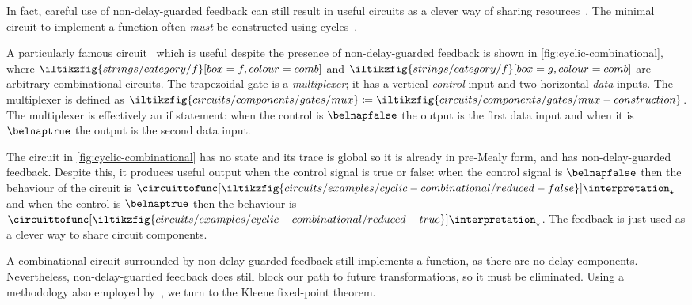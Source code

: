 In fact, careful use of non-delay-guarded feedback can still result in useful
circuits as a clever way of sharing
resources~\cite{malik1994analysis,riedel2004cyclic,mendler2012constructive}.
The minimal circuit to implement a function often \emph{must} be
constructed using cycles~\cite{rivest1977necessity,riedel2003synthesis}.



\begin{example}\label{ex:cyclic-combinational}
    A particularly famous circuit~\cite{malik1994analysis} which is useful
    despite the presence of non-delay-guarded feedback is shown in
    \cref{fig:cyclic-combinational}, where \(
    \iltikzfig{strings/category/f}[box=f,colour=comb]
    \) and \(
    \iltikzfig{strings/category/f}[box=g,colour=comb]
    \) are arbitrary combinational circuits.
    The trapezoidal gate is a \emph{multiplexer}; it has a vertical
    \emph{control} input and two horizontal \emph{data} inputs.
    The multiplexer is defined as \(
    \iltikzfig{circuits/components/gates/mux}
    \coloneqq
    \iltikzfig{circuits/components/gates/mux-construction}
    \).
    The multiplexer is effectively an if statement: when the control is
    \(\belnapfalse\) the output is the first data input and when it is
    \(\belnaptrue\) the output is the second data input.

    The circuit in \cref{fig:cyclic-combinational} has no state and its trace is
    global so it is already in pre-Mealy form, and has
    non-delay-guarded feedback.
    Despite this, it produces useful output when the control signal is true or
    false:
    when the control signal is \(\belnapfalse\) then the behaviour of the
    circuit is \(
    \circuittofunc[
        \iltikzfig{circuits/examples/cyclic-combinational/reduced-false}
    ]{\interpretation_\star}
    \) and when the control is \(\belnaptrue\) then the behaviour is \(
    \circuittofunc[
        \iltikzfig{circuits/examples/cyclic-combinational/reduced-true}
    ]{\interpretation_\star}
    \).
    The feedback is just used as a clever way to share circuit components.
\end{example}



A combinational circuit surrounded by non-delay-guarded feedback still
implements a function, as there are no delay components.
Nevertheless, non-delay-guarded feedback does still block our path to future
transformations, so it must be eliminated.
Using a methodology also employed by~\cite{riedel2012cyclic}, we turn to the
Kleene fixed-point theorem.


